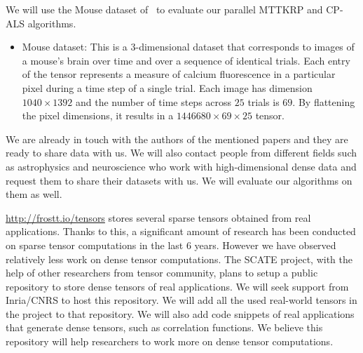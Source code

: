 \documentclass[a4paper,11pt]{article}
\begin{document}
	We will use the Mouse dataset of~\cite{EHBKMP-TOMS-2021} to evaluate our parallel MTTKRP and CP-ALS algorithms.
	\begin{itemize}
		\item Mouse dataset: This is a 3-dimensional dataset that corresponds to images of a mouse's brain over time and over a sequence of identical trials. Each entry of the tensor represents a measure of calcium fluorescence in a particular pixel during a time step of a single trial. Each image has dimension $1040\times 1392$ and the number of time steps across $25$ trials is $69$. By flattening the pixel dimensions, it results in a $1446680 \times 69 \times 25$ tensor. 
	\end{itemize}
	We are already in touch with the authors of the mentioned papers and they are ready to share data with us.
	We will also contact people from different fields such as astrophysics and neuroscience who work with high-dimensional dense data and request them to share their datasets with us. We will evaluate our algorithms on them as well.
	
	
	\medskip
	
	\noindent\url{http://frostt.io/tensors} stores several sparse tensors obtained from real applications. Thanks to this, a significant amount of research has been conducted on sparse tensor computations in the last 6 years. However we have observed relatively less work on dense tensor computations. The SCATE project, with the help of other researchers from tensor community, plans to setup a public repository to store dense tensors of real applications. We will seek support from Inria/CNRS to host this repository.
	We will add all the used real-world tensors in the project to that repository. We will also add code snippets of real applications that generate dense tensors, such as correlation functions. We believe this repository will help researchers to work more on dense tensor computations. 
	
	
\end{document}
